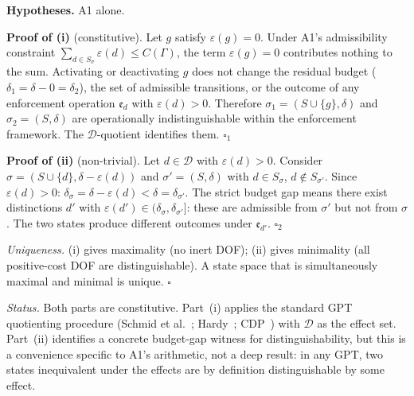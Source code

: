 \documentclass[11pt]{article}
\theoremstyle{remark}
\begin{document}
\smallskip\noindent\textbf{Hypotheses.}  A1 alone.

\smallskip\noindent\textbf{Proof of (i)} (constitutive).  Let $g$ satisfy $\varepsilon(g) = 0$.  Under A1's admissibility constraint $\sum_{d \in S_\sigma} \varepsilon(d) \le C(\Gamma)$, the term $\varepsilon(g) = 0$ contributes nothing to the sum.  Activating or deactivating $g$ does not change the residual budget ($\delta_1 = \delta - 0 = \delta_2$), the set of admissible transitions, or the outcome of any enforcement operation $\mathfrak{e}_d$ with $\varepsilon(d) > 0$.  Therefore $\sigma_1 = (S \cup \{g\}, \delta)$ and $\sigma_2 = (S, \delta)$ are operationally indistinguishable within the enforcement framework.  The $\mathcal{D}$-quotient identifies them.  \hfill$\square_1$

\smallskip\noindent\textbf{Proof of (ii)} (non-trivial).  Let $d \in \mathcal{D}$ with $\varepsilon(d) > 0$.  Consider $\sigma = (S \cup \{d\}, \delta - \varepsilon(d))$ and $\sigma' = (S, \delta)$ with $d \in S_\sigma$, $d \notin S_{\sigma'}$.  Since $\varepsilon(d) > 0$: $\delta_\sigma = \delta - \varepsilon(d) < \delta = \delta_{\sigma'}$.  The strict budget gap means there exist distinctions $d'$ with $\varepsilon(d') \in (\delta_\sigma, \delta_{\sigma'}]$: these are admissible from $\sigma'$ but not from $\sigma$.  The two states produce different outcomes under $\mathfrak{e}_{d'}$.  \hfill$\square_2$

\textit{Uniqueness.}  (i) gives maximality (no inert DOF); (ii) gives minimality (all positive-cost DOF are distinguishable).  A state space that is simultaneously maximal and minimal is unique.  \hfill$\square$

\smallskip\noindent\textit{Status.}  Both parts are constitutive.  Part~(i) applies the standard GPT quotienting procedure (Schmid et al.~\cite{Schmid2021}; Hardy~\cite{Hardy2001}; CDP~\cite{CDP2011}) with $\mathcal{D}$ as the effect set.  Part~(ii) identifies a concrete budget-gap witness for distinguishability, but this is a convenience specific to A1's arithmetic, not a deep result: in any GPT, two states inequivalent under the effects are by definition distinguishable by some effect.
\end{document}

